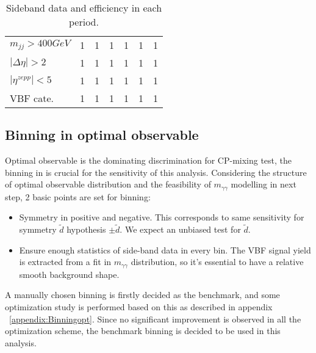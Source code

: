 \begin{table}[htbp]
\begin{center}
\begin{tabular}{l|cccccc}
$m_{jj}>400GeV$      & 1               & 1              & 1              & 1              & 1               & 1              \\
$|\Delta\eta|>2$     & 1               & 1              & 1              & 1              & 1               & 1              \\
$|\eta^{zepp}|<5$    & 1               & 1              & 1              & 1              & 1               & 1              \\
VBF cate.            & 1               & 1              & 1              & 1              & 1               & 1              \\
\hline
\end{tabular}
\caption{Sideband data and efficiency in each period.}
\label{tab:cutflowSBdata}
\end{center}
\end{table}

\subsection{Binning in optimal observable}
\label{subsec:OObinning}

Optimal observable is the dominating discrimination for CP-mixing test, the binning in is crucial for the sensitivity of this analysis. Considering the structure of optimal observable distribution and the feasibility of $m_{\gamma\gamma}$ modelling in next step, 2 basic points are set for binning: 

\begin{itemize}
\item{} Symmetry in positive and negative. This corresponds to same sensitivity for symmetry $\tilde{d}$ hypothesis $\pm \tilde{d}$. We expect an unbiased test for $\tilde{d}$. 
\item{} Ensure enough statistics of side-band data in every bin. The VBF signal yield is extracted from a fit in $m_{\gamma\gamma}$ distribution, so it’s essential to have a relative smooth background shape. 

\end{itemize}

A manually chosen binning is firstly decided as the benchmark, and some optimization study is performed based on this as described in appendix ~\ref{appendix:Binningopt}. Since no significant improvement is observed in all the optimization scheme, the benchmark binning is decided to be used in this analysis.


